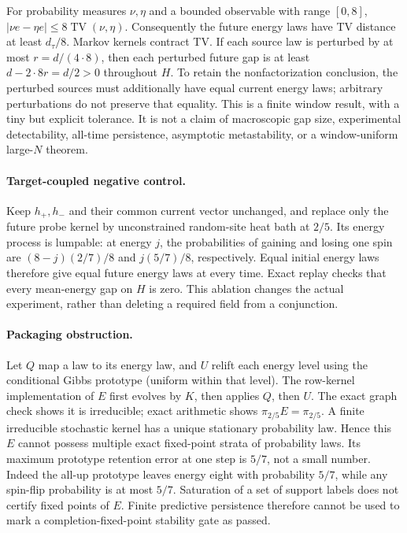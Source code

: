 \documentclass{article}
\begin{document}
For probability measures $\nu,\eta$ and a bounded observable with range
$[0,8]$, $|\nu e-\eta e|\leq8\operatorname{TV}(\nu,\eta)$.
Consequently the future energy laws have TV distance at least $d_\tau/8$.
Markov kernels contract TV. If each source law is perturbed by at most
$r=d/(4\cdot8)$, then each perturbed future gap is at least
$d-2\cdot8r=d/2>0$ throughout $H$. To retain the nonfactorization conclusion,
the perturbed sources must additionally have equal current energy laws;
arbitrary perturbations do not preserve that equality. This is a finite
window result, with a tiny but explicit tolerance. It is not a claim of
macroscopic gap size, experimental detectability, all-time persistence,
asymptotic metastability, or a window-uniform large-$N$ theorem.

\paragraph{Target-coupled negative control.}
Keep $h_+,h_-$ and their common current vector unchanged, and replace only
the future probe kernel by unconstrained random-site heat bath at $2/5$.
Its energy process is lumpable: at energy $j$, the probabilities of gaining
and losing one spin are $(8-j)(2/7)/8$ and $j(5/7)/8$, respectively.
Equal initial energy laws therefore give equal future energy laws at every
time. Exact replay checks that every mean-energy gap on $H$ is zero.
This ablation changes the actual experiment, rather than deleting a required
field from a conjunction.

\paragraph{Packaging obstruction.}
Let $Q$ map a law to its energy law, and $U$ relift each energy level using
the conditional Gibbs prototype (uniform within that level). The row-kernel
implementation of $E$ first evolves by $K$, then applies $Q$, then $U$.
The exact graph check shows it is irreducible; exact arithmetic shows
$\pi_{2/5}E=\pi_{2/5}$. A finite irreducible stochastic kernel has a unique
stationary probability law. Hence this $E$ cannot possess multiple exact
fixed-point strata of probability laws. Its maximum prototype retention
error at one step is $5/7$, not a small number. Indeed the all-up prototype
leaves energy eight with probability $5/7$, while any spin-flip probability
is at most $5/7$. Saturation of a set of support labels does not certify
fixed points of $E$. Finite predictive persistence therefore cannot be
used to mark a completion-fixed-point stability gate as passed.
\end{document}
